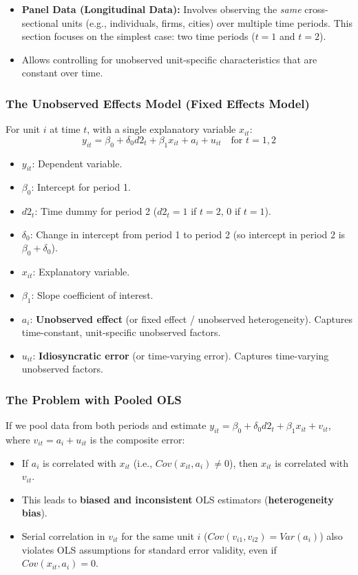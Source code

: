\documentclass[a4paper, 10pt]{article}
\theoremstyle{definition}	%
\begin{document}
\begin{itemize}
    \item \textbf{Panel Data (Longitudinal Data):} Involves observing the \textit{same} cross-sectional units (e.g., individuals, firms, cities) over multiple time periods. This section focuses on the simplest case: two time periods (\(t=1\) and \(t=2\)).
    \item Allows controlling for unobserved unit-specific characteristics that are constant over time.
\end{itemize}

\subsubsection{The Unobserved Effects Model (Fixed Effects Model)}
For unit \(i\) at time \(t\), with a single explanatory variable \(x_{it}\):
\begin{equation} 
y_{it} = \beta_0 + \delta_0 d2_t + \beta_1 x_{it} + a_i + u_{it} \quad \text{for } t=1, 2 \label{eq:13.20}
\end{equation}
\begin{itemize}
    \item \(y_{it}\): Dependent variable.
    \item \(\beta_0\): Intercept for period 1.
    \item \(d2_t\): Time dummy for period 2 (\(d2_t=1\) if \(t=2\), 0 if \(t=1\)).
    \item \(\delta_0\): Change in intercept from period 1 to period 2 (so intercept in period 2 is \(\beta_0 + \delta_0\)).
    \item \(x_{it}\): Explanatory variable.
    \item \(\beta_1\): Slope coefficient of interest.
    \item \(a_i\): \textbf{Unobserved effect} (or fixed effect / unobserved heterogeneity). Captures time-constant, unit-specific unobserved factors.
    \item \(u_{it}\): \textbf{Idiosyncratic error} (or time-varying error). Captures time-varying unobserved factors.
\end{itemize}

\subsubsection{The Problem with Pooled OLS}
If we pool data from both periods and estimate \(y_{it} = \beta_0 + \delta_0 d2_t + \beta_1 x_{it} + v_{it}\), where \(v_{it} = a_i + u_{it}\) is the composite error:
\begin{itemize}
    \item If \(a_i\) is correlated with \(x_{it}\) (i.e., \(Cov(x_{it}, a_i) \neq 0\)), then \(x_{it}\) is correlated with \(v_{it}\).
    \item This leads to \textbf{biased and inconsistent} OLS estimators (\textbf{heterogeneity bias}).
    \item Serial correlation in \(v_{it}\) for the same unit \(i\) (\(Cov(v_{i1}, v_{i2}) = Var(a_i)\)) also violates OLS assumptions for standard error validity, even if \(Cov(x_{it},a_i)=0\).
\end{itemize}
\end{document}
